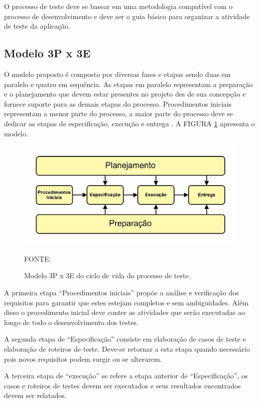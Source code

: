 O processo de teste deve se basear em uma metodologia compatível com o processo de desenvolvimento e deve ser o guia básico para organizar a atividade de teste da aplicação. 


\subsection{Modelo 3P x 3E}

O modelo proposto é composto por diversas fases e etapas sendo duas em paralelo e quatro em sequência. As etapas em paralelo representam a preparação e o planejamento que devem estar presentes no projeto des de sua concepção e fornece suporte para as demais etapas do processo. Procedimentos iniciais representam a menor parte do processo, a maior parte do processo deve se dedicar as etapas de especificação, execução e entrega \cite{riosMoreira}. A FIGURA \ref{modelo3p3e} apresenta o modelo.


\begin{figure}[H]
	\centering
	\includegraphics[scale=3.5]{dados/figuras/modelo3px3e.png}
	\caption{Modelo 3P x 3E do ciclo de vida do processo de teste.}FONTE: \cite{riosMoreira}
	\label{modelo3p3e}
\end{figure}



A primeira etapa “Procedimentos iniciais” propõe a análise e verificação dos requisitos para garantir que estes estejam completos e sem ambiguidades. Além disso o procedimento inicial deve conter as atividades que serão executadas ao longo de todo o desenvolvimento dos testes.


A segunda etapa de “Especificação” consiste em elaboração de casos de teste e elaboração de roteiros de teste. Deve-se retornar a esta etapa quando necessário pois novos requisitos podem surgir ou se alterarem.

A terceira etapa de “execução” se refere a etapa anterior de “Especificação”, os casos e roteiros de testes devem ser executados e seus resultados encontrados devem ser relatados.


